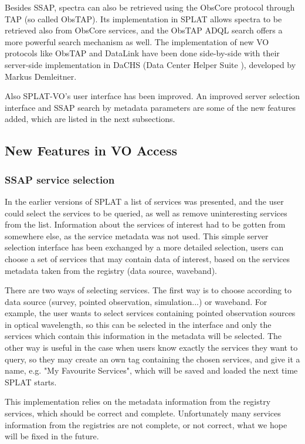 \documentclass[final,authoryear,5p,times,twocolumn]{elsarticle}
\begin{document}
Besides SSAP, spectra can also be retrieved using the ObsCore protocol
through TAP (so called ObsTAP\cite{obstap}). Its implementation in
SPLAT allows spectra to be retrieved also from ObsCore services, and
the ObsTAP ADQL\cite{adql} search offers a more powerful search
mechanism as well. The implementation of new VO protocols like ObsTAP
and DataLink have been done side-by-side with their server-side
implementation in DaCHS (Data Center Helper Suite \cite{dachs}),
developed by Markus Demleitner.

Also SPLAT-VO's user interface has been improved. An improved server
selection interface and SSAP search by metadata parameters are some of
the new features added, which are listed in the next subsections.

\subsection{New Features in VO Access}

\subsubsection{SSAP service selection}

In the earlier versions of SPLAT a list of services was presented, and
the user could select the services to be queried, as well as remove
uninteresting services from the list. Information about the services
of interest had to be gotten from somewhere else, as the service
metadata was not used.  This simple server selection interface has
been exchanged by a more detailed selection, users can choose a set of
services that may contain data of interest, based on the services
metadata taken from the registry (data source, waveband).

There are two ways of selecting services. The first way is to choose
according to data source (survey, pointed observation, simulation...)
or waveband.  For example, the user wants to select services
containing pointed observation sources in optical wavelength, so this
can be selected in the interface and only the services which contain
this information in the metadata will be selected.  The other way is
useful in the case when users know exactly the services they want to
query, so they may create an own tag containing the chosen services,
and give it a name, e.g. "My Favourite Services", which will be saved
and loaded the next time SPLAT starts.

This implementation relies on the metadata information from the
registry services, which should be correct and complete. Unfortunately
many services information from the registries are not complete, or not
correct, what we hope will be fixed in the future.
\end{document}
